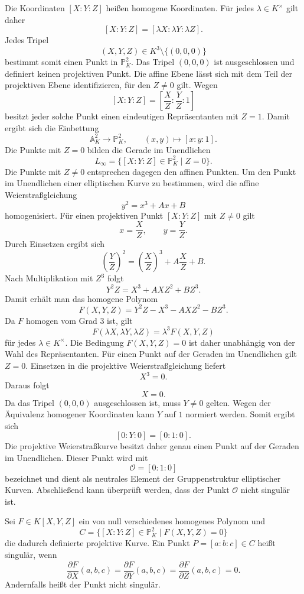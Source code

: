 Die Koordinaten $[X:Y:Z]$ heißen homogene Koordinaten. Für jedes $\lambda\in K^\times$ gilt daher
\[
    [X:Y:Z]
    =
    [\lambda X:\lambda Y:\lambda Z].
\]
Jedes Tripel
\[
    (X,Y,Z)\in K^3\setminus\{(0,0,0)\}
\]
bestimmt somit einen Punkt in $\mathbb{P}^2_K$. Das Tripel $(0,0,0)$ ist ausgeschlossen und definiert keinen projektiven Punkt. Die affine Ebene lässt sich mit dem Teil der projektiven Ebene identifizieren, für den $Z\neq 0$ gilt.  Wegen
\[
    [X:Y:Z]=\left[\frac{X}{Z}:\frac{Y}{Z}:1\right]
\]
besitzt jeder solche Punkt einen eindeutigen Repräsentanten mit $Z=1$. Damit ergibt sich die Einbettung
\[
    \mathbb{A}^2_K
    \longrightarrow
    \mathbb{P}^2_K,
    \qquad
    (x,y)
    \longmapsto
    [x:y:1].
\]
Die Punkte mit $Z=0$ bilden die Gerade im Unendlichen
\[
    L_\infty
    =
    \{[X:Y:Z]\in\mathbb{P}^2_K \mid Z=0\}.
\]
Die Punkte mit $Z\neq 0$ entsprechen dagegen den affinen Punkten. Um den Punkt im Unendlichen einer elliptischen Kurve zu bestimmen, wird die affine Weierstraßgleichung
\[
    y^2=x^3+Ax+B
\]
homogenisiert. Für einen projektiven Punkt $[X:Y:Z]$ mit $Z\neq 0$ gilt
\[
    x=\frac{X}{Z},
    \qquad
    y=\frac{Y}{Z}.
\]
Durch Einsetzen ergibt sich
\[
    {\left(\frac{Y}{Z}\right)}^2
        =
        {\left(\frac{X}{Z}\right)}^3
    +
    A\frac{X}{Z}
    +
    B.
\]
Nach Multiplikation mit $Z^3$ folgt
\[
    Y^2Z
    =
    X^3+AXZ^2+BZ^3.
\]
Damit erhält man das homogene Polynom
\[
    F(X,Y,Z)
    =
    Y^2Z-X^3-AXZ^2-BZ^3.
\]
Da $F$ homogen vom Grad $3$ ist, gilt
\[
    F(\lambda X,\lambda Y,\lambda Z)
    =\lambda^3F(X,Y,Z)
\]
für jedes $\lambda\in K^\times$. Die Bedingung $F(X,Y,Z)=0$ ist daher unabhängig von der Wahl des Repräsentanten. Für einen Punkt auf der Geraden im Unendlichen gilt $Z=0$. Einsetzen in die projektive Weierstraßgleichung liefert
\[
    X^3=0.
\]
Daraus folgt
\[
    X=0.
\]
Da das Tripel $(0,0,0)$ ausgeschlossen ist, muss $Y\neq 0$ gelten. Wegen der Äquivalenz homogener Koordinaten kann $Y$ auf $1$ normiert werden. Somit ergibt sich
\[
    [0:Y:0]
    =
    [0:1:0].
\]
Die projektive Weierstraßkurve besitzt daher genau einen Punkt auf der Geraden im Unendlichen. Dieser Punkt wird mit
\[
    \mathcal{O}
    =
    [0:1:0]
\]
bezeichnet und dient als neutrales Element der Gruppenstruktur elliptischer Kurven. Abschließend kann überprüft werden, dass der Punkt $\mathcal{O}$ nicht singulär ist.

\begin{definition}
    Sei $F\in K[X,Y,Z]$ ein von null verschiedenes homogenes Polynom und
    \[
        C = \{[X:Y:Z]\in\mathbb{P}^2_K \mid F(X,Y,Z)=0\}
    \]
    die dadurch definierte projektive Kurve. Ein Punkt \( P=[a:b:c]\in C\) heißt singulär, wenn
    \[
        \frac{\partial F}{\partial X}(a,b,c)
        =
        \frac{\partial F}{\partial Y}(a,b,c)
        =
        \frac{\partial F}{\partial Z}(a,b,c)
        =
        0.
    \]
    Andernfalls heißt der Punkt nicht singulär.
\end{definition}

